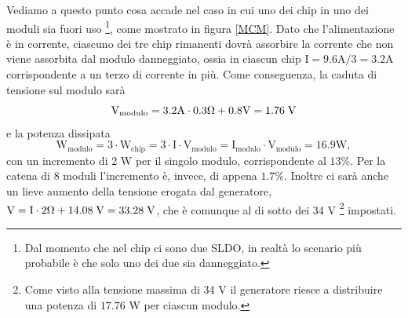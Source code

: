 Vediamo a questo punto cosa accade nel caso in cui uno dei chip in uno dei moduli sia fuori uso
\footnote{
  Dal momento che nel chip ci sono due SLDO, in realtà lo scenario più probabile è che solo uno dei due sia danneggiato.
},
come mostrato in figura \ref{MCM}.
Dato che l'alimentazione è in corrente, ciascuno dei tre chip rimanenti dovrà assorbire la corrente che non viene assorbita dal modulo danneggiato, ossia in ciascun chip $\mathrm{I = 9.6A / 3 = 3.2 A}$ corrispondente a un terzo di corrente in più.
Come conseguenza, la caduta di tensione sul modulo sarà 
\begin{equation*}
  \mathrm{V_{modulo} = 3.2 A \cdot 0.3 \Omega + 0.8 V = 1.76 \rm \; V}
\end{equation*}
e la potenza dissipata
\begin{equation*}
  \mathrm{W_{modulo} = 3 \cdot W_{chip} = 3 \cdot I \cdot V_{modulo} = I_{modulo} \cdot V_{modulo} = 16.9W,}
\end{equation*}
con un incremento di 2 W per il singolo modulo, corrispondente al $13 \%$.
Per la catena di 8 moduli l'incremento è, invece, di appena $1.7\%$.
Inoltre ci sarà anche un lieve aumento della tensione erogata dal generatore, $\mathrm{V=I \cdot 2 \Omega +14.08 \rm \; V=33.28 \rm \; V}$, che è comunque al di sotto dei 34 V
\footnote{
  Come visto alla tensione massima di  34 V il generatore riesce a distribuire una potenza di $17.76$ W per ciascun modulo.
}
impostati.



